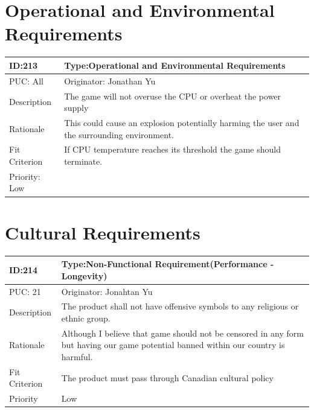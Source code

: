 \documentclass{article}
\begin{document}
\section{Operational and Environmental Requirements}
\begin{table}[H]
    \begin{tabular}{|l|l|l|}
    \hline
    ID:213 & \multicolumn{2}{l|}{Type:Operational and Environmental Requirements} \\ \hline
    PUC: All & \multicolumn{2}{l|}{Originator: Jonathan Yu} \\ \hline
    Description & \multicolumn{2}{m{0.85\textwidth}|}{The game will not overuse the CPU or overheat the power supply} \\ \hline
    Rationale & \multicolumn{2}{m{0.85\textwidth}|}{This could cause an explosion potentially harming the user and the surrounding environment.} \\ \hline
    Fit Criterion & \multicolumn{2}{m{0.85\textwidth}|}{If CPU temperature reaches its threshold the game should terminate.} \\ \hline
    Priority: Low \\ \hline
    \end{tabular}
    \end{table}
    
\section{Cultural Requirements}
\begin{table}[H]
    \begin{tabular}{|l|l|l|}
    \hline
    ID:214 & \multicolumn{2}{l|}{Type:Non-Functional Requirement(Performance - Longevity)} \\ \hline
    PUC: 21 & \multicolumn{2}{l|}{Originator: Jonahtan Yu} \\ \hline
    Description & \multicolumn{2}{m{0.85\textwidth}|}{The product shall not have offensive symbols to any religious or ethnic group.} \\ \hline
    Rationale & \multicolumn{2}{m{0.85\textwidth}|}{Although I believe that game should not be censored in any form but having our game potential banned within our country is harmful.} \\ \hline
    Fit Criterion & \multicolumn{2}{m{0.85\textwidth}|}{The product must pass through Canadian cultural policy} \\ \hline
    Priority& \multicolumn{2}{m{0.85\textwidth}|}{Low }\\ \hline
    \end{tabular}
    \end{table}
    
\end{document}
